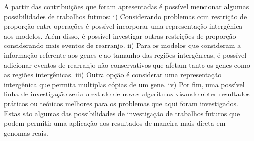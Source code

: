 A partir das contribuições que foram apresentadas é possível mencionar algumas possibilidades de trabalhos futuros: i) Considerando problemas com restrição de proporção entre operações é possível incorporar uma representação intergênica aos modelos. Além disso, é possível investigar outras restrições de proporção considerando mais eventos de rearranjo. ii) Para os modelos que consideram a informação referente aos genes e ao tamanho das regiões intergênicas, é possível adicionar eventos de rearranjo não conservativos que afetam tanto os genes como as regiões intergênicas. iii) Outra opção é considerar uma representação intergênica que permita multiplas cópias de um gene. iv) Por fim, uma possível linha de investigação seria o estudo de novos algoritmos visando obter resultados práticos ou teóricos melhores para os problemas que aqui foram investigados.  Estas são algumas das possibilidades de investigação de trabalhos futuros que podem permitir uma aplicação dos resultados de maneira mais direta em genomas reais. 